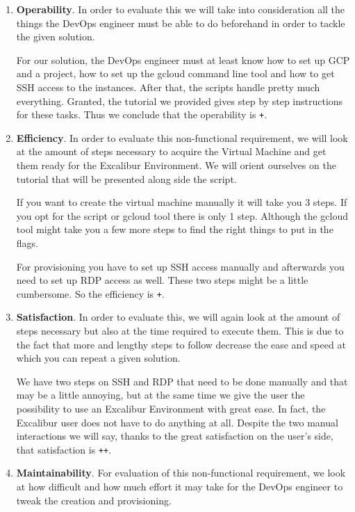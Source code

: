\begin{enumerate}

	\item \textbf{Operability}.  In order to evaluate
	this we will take into consideration all the things the DevOps
	engineer must be able to do beforehand in order to tackle the
	given solution.

	For our solution, the DevOps engineer must at least know how to
	set up GCP and a project, how to set up the gcloud command line
	tool and how to get SSH access to the instances. After that, the
	scripts handle pretty much everything. Granted, the tutorial we
	provided gives step by step instructions for these tasks. Thus we
	conclude that the operability is \verb|+|.

	\item \textbf{Efficiency}. In order to evaluate
	this non-functional requirement, we will look at the amount of
	steps necessary to acquire the Virtual Machine and get them ready
	for the Excalibur Environment. We will orient ourselves on the
	tutorial that will be presented along side the script.

	If you want to create the virtual machine manually it will take
	you 3 steps. If you opt for the script or gcloud tool there is
	only 1 step. Although the gcloud tool might take you a few more
	steps to find the right things to put in the flags.

	For provisioning you have to set up SSH access manually and
	afterwards you need to set up RDP access as well. These two steps
	might be a little cumbersome. So the efficiency is \verb|+|.

	\item \textbf{Satisfaction}.  In order to evaluate
	this, we will again look at the amount of steps necessary but also
	at the time required to execute them.  This is due to the fact
	that more and lengthy steps to follow decrease the ease and speed
	at which you can repeat a given solution.

	We have two steps on SSH and RDP that need to be done manually and
	that may be a little annoying, but at the same time we give the
	user the possibility to use an Excalibur Environment with great
	ease. In fact, the Excalibur user does not have to do anything at
	all. Despite the two manual interactions we will say, thanks to
	the great satisfaction on the user's side, that satisfaction is
	\verb|++|.

	\item \textbf{Maintainability}.  For evaluation of this
	non-functional requirement, we look at how difficult and how much
	effort it may take for the DevOps engineer to tweak the creation
	and provisioning.


\end{enumerate}
